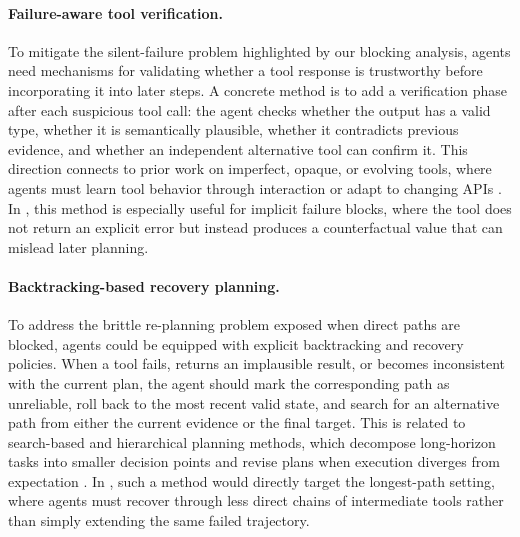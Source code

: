 \paragraph{Failure-aware tool verification.}
To mitigate the silent-failure problem highlighted by our blocking analysis, agents need mechanisms for validating whether a tool response is trustworthy before incorporating it into later steps. 
A concrete method is to add a verification phase after each suspicious tool call: the agent checks whether the output has a valid type, whether it is semantically plausible, whether it contradicts previous evidence, and whether an independent alternative tool can confirm it. 
This direction connects to prior work on imperfect, opaque, or evolving tools, where agents must learn tool behavior through interaction or adapt to changing APIs \citep{OpaqueToolsBench,ToolSandbox, acikgoz2026toolr0}. 
In \bench{}, this method is especially useful for implicit failure blocks, where the tool does not return an explicit error but instead produces a counterfactual value that can mislead later planning.

\paragraph{Backtracking-based recovery planning.}
To address the brittle re-planning problem exposed when direct paths are blocked, agents could be equipped with explicit backtracking and recovery policies. 
When a tool fails, returns an implausible result, or becomes inconsistent with the current plan, the agent should mark the corresponding path as unreliable, roll back to the most recent valid state, and search for an alternative path from either the current evidence or the final target. This is related to search-based and hierarchical planning methods, which decompose long-horizon tasks into smaller decision points and revise plans when execution diverges from expectation \citep{AnyTool,verma2025leap,koh2026tree}. In \bench{}, such a method would directly target the longest-path setting, where agents must recover through less direct chains of intermediate tools rather than simply extending the same failed trajectory.

